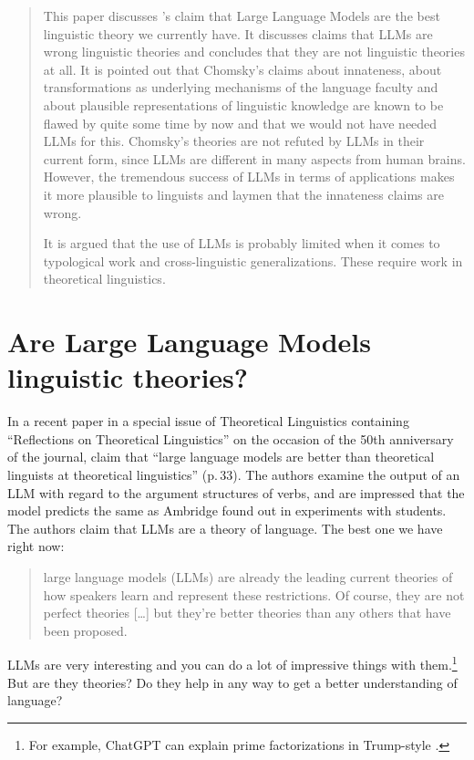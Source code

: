 
\begin{abstract}
This paper discusses \citeauthor{AmbridgeBlything2024a}'s claim \citeyearpar{AmbridgeBlything2024a}
that Large Language Models are the best linguistic theory we currently have. It discusses claims
that LLMs are wrong linguistic theories and concludes that they are not linguistic theories at
all. It is pointed out that Chomsky's claims about innateness, about transformations as underlying
mechanisms of the language faculty and about plausible representations of linguistic knowledge are
known to be flawed by quite some time by now and that we would not have needed LLMs for
this. Chomsky's theories are not refuted by LLMs in their current form, since LLMs are different in
many aspects from human brains. However, the tremendous success of LLMs in terms of applications
makes it more plausible to linguists and laymen that the innateness claims are wrong. 

It is argued that the use of LLMs is probably limited when it comes to typological work and
cross-linguistic generalizations. These require work in theoretical linguistics.
\end{abstract}

\section{Are Large Language Models linguistic theories?}

In a recent paper in a special issue of Theoretical Linguistics containing ``Reflections on
Theoretical Linguistics'' on the occasion of the 50th anniversary of the journal,
\citet{AmbridgeBlything2024a} claim that ``large language models are better than theoretical
linguists at theoretical linguistics'' (p.\,33). The authors examine the output of an LLM with
regard to the argument structures of verbs, and are impressed that the model predicts the same as
Ambridge found out in experiments with students. The authors claim that LLMs are a theory of
language. The best one we have right now:
\begin{quote}
large language models (LLMs) are already the leading current theories of how speakers learn and
represent these restrictions. Of course, they are not perfect theories [\ldots] but they’re better
theories than any others that have been proposed. \citet[]{AmbridgeBlything2024a}
\end{quote}
LLMs are very interesting and you can do a lot of impressive things with them.\footnote{%
For example, ChatGPT can explain prime factorizations in Trump-style \citep[356--357]{Piantadosi2024a}.
} But are they theories? Do they help in any way to get a better understanding of language?


